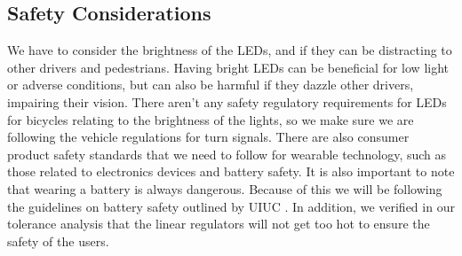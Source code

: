 \documentclass[12pt]{article}
\begin{document}
\subsection{Safety Considerations}
We have to consider the brightness of the LEDs, and if they can be distracting to other drivers and pedestrians. Having bright LEDs can be beneficial for low light or adverse conditions, but can also be harmful if they dazzle other drivers, impairing their vision. There aren’t any safety regulatory requirements for LEDs for bicycles relating to the brightness of the lights, so we make sure we are following the vehicle regulations for turn signals. \cite{CFR571_108} There are also consumer product safety standards that we need to follow for wearable technology, such as those related to electronics devices and battery safety. It is also important to note that wearing a battery is always dangerous. Because of this we will be following the guidelines on battery safety outlined by UIUC \cite{UIUCBatterySafety2023}. In addition, we verified in our tolerance analysis that the linear regulators will not get too hot to ensure the safety of the users.



\newpage

\end{document}
